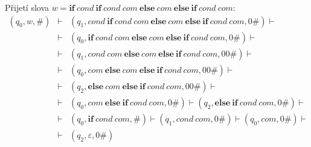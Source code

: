 \documentclass[a4paper,12pt]{article}
\begin{document}
\begin{enumerate}[label=\textbf{\arabic*}.]
\begin{enumerate}
\begin{center}
      \end{center}
     Přijetí slova $w = \mathbf{if}\ cond\ \mathbf{if}\ cond\ com\ \mathbf{else}\ com\ \mathbf{else}\ \mathbf{if}\ cond\ com$:
     \begin{eqnarray*}
      (q_0, w, \#) &\vdash& (q_1, cond\ \mathbf{if}\ cond\ com\ \mathbf{else}\ com\ \mathbf{else}\ \mathbf{if}\ cond\ com, 0\#) \vdash \\
      &\vdash& (q_0, \mathbf{if}\ cond\ com\ \mathbf{else}\ com\ \mathbf{else}\ \mathbf{if}\ cond\ com, 0\#) \vdash\\
      &\vdash& (q_1, cond\ com\ \mathbf{else}\ com\ \mathbf{else}\ \mathbf{if}\ cond\ com, 00\#) \vdash\\ 
      &\vdash&(q_0, com\ \mathbf{else}\ com\ \mathbf{else}\ \mathbf{if}\ cond\ com, 00\#) \vdash\\
      &\vdash& (q_2, \mathbf{else}\ com\ \mathbf{else}\ \mathbf{if}\ cond\ com, 00\#) \vdash \\
      &\vdash&(q_0, com\ \mathbf{else}\ \mathbf{if}\ cond\ com, 0\#) \vdash (q_2, \mathbf{else}\ \mathbf{if}\ cond\ com, 0\#) \vdash\\
      &\vdash&(q_0, \mathbf{if}\ cond\ com, \#) \vdash (q_1, cond\ com, 0\#) \vdash (q_0, com, 0\#) \vdash\\
      &\vdash&(q_2, \varepsilon, 0\#) 
     \end{eqnarray*}
 \end{enumerate}


\end{enumerate}
\end{document}
